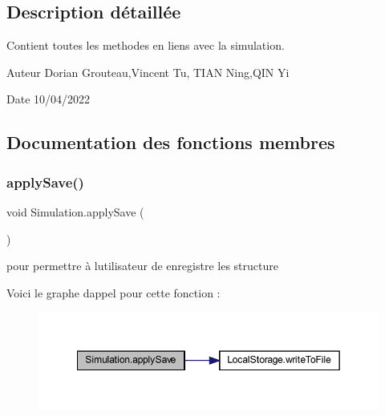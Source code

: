 \subsection{Description détaillée}
Contient toutes les methodes en liens avec la simulation. 

\begin{DoxyAuthor}{Auteur}
Dorian Grouteau,Vincent Tu, T\+I\+AN Ning,Q\+IN Yi 
\end{DoxyAuthor}
\begin{DoxyDate}{Date}
10/04/2022 
\end{DoxyDate}


\subsection{Documentation des fonctions membres}
\mbox{\label{class_simulation_aee60f7c0cce0789d82fe7a324f1fbffd}} 
\subsubsection{\texorpdfstring{apply\+Save()}{applySave()}}
{\footnotesize\ttfamily void Simulation.\+apply\+Save (\begin{DoxyParamCaption}{ }\end{DoxyParamCaption})\hspace{0.3cm}{\ttfamily [inline]}}



pour permettre à l\textquotesingle{}utilisateur de enregistre les structure 

Voici le graphe d\textquotesingle{}appel pour cette fonction \+:\nopagebreak
\begin{figure}[H]
\begin{center}
\leavevmode
\includegraphics[width=349pt]{class_simulation_aee60f7c0cce0789d82fe7a324f1fbffd_cgraph}
\end{center}
\end{figure}
\mbox{\label{class_simulation_a3fde1a020def21f5f41794735b76c686}} 
